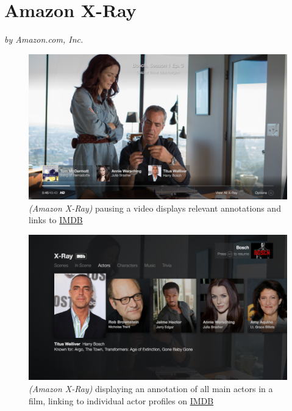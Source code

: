 


\section{Amazon X-Ray}
\label{sec:priorwork:amazon-x-ray}
\textit{by Amazon.com, Inc.}

\begin{figure}[ht]
	\includegraphics[width=\textwidth]{gfx/amazon-x-ray/pause-quick-view-930x523.png}
	\caption{\textit{(Amazon X-Ray)} pausing a video displays relevant annotations and links to \href{http://www.imdb.com}{IMDB}} 
	\label{fig:amazon-x-ray:paused-video-annotations}
	\center{\noindent\rule{0.75\textwidth}{0.4pt}}
\end{figure} 

\begin{figure}[ht]
	\includegraphics[width=\textwidth]{gfx/amazon-x-ray/xray-actors-930x523.png}
	\caption{\textit{(Amazon X-Ray)} displaying an annotation of all main actors in a film, linking to individual actor profiles on \href{http://www.imdb.com}{IMDB}} 
	\label{fig:amazon-x-ray:actors-listing}
	\center{\noindent\rule{0.75\textwidth}{0.4pt}}
\end{figure}

